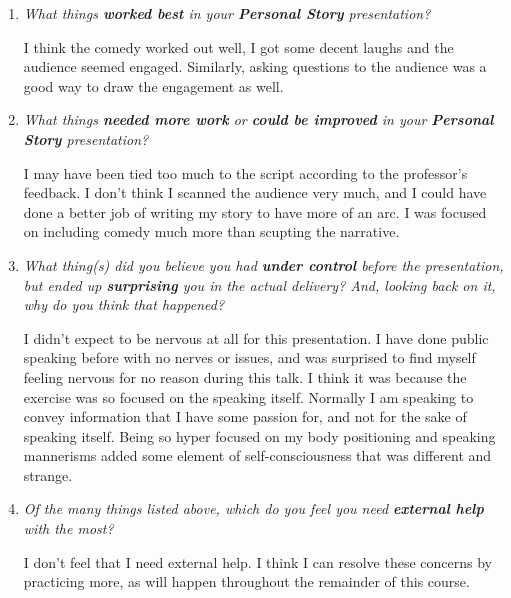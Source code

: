 \documentclass{article}
\newcommand{\ans}[1]{\color{blue} #1 \color{black}}
\begin{document}
\begin{enumerate}
        \item \emph{What things \textbf{worked best} in your \textbf{Personal
              Story} presentation?}
            
            \ans{
                I think the comedy worked out well, I got some decent laughs and
                the audience seemed engaged. Similarly, asking questions to the
                audience was a good way to draw the engagement as well.
            } \hfill \\

        \item \emph{What things \textbf{needed more work} or
              \textbf{could be improved} in your \textbf{Personal Story}
              presentation?}

            \ans{
                I may have been tied too much to the script according to the
                professor's feedback. I don't think I scanned the audience very 
                much, and I could have done a better job of writing my story to
                have more of an arc. I was focused on including comedy much more
                than scupting the narrative.
            } \hfill \\

        \item \emph{What thing(s) did you believe you had \textbf{under control}
              before the presentation, but ended up \textbf{surprising} you in
              the actual delivery? And, looking back on it, why do you think
              that happened?}

            \ans{
                I didn't expect to be nervous at all for this presentation. I
                have done public speaking before with no nerves or issues, and
                was surprised to find myself feeling nervous for no reason
                during this talk. I think it was because the exercise was so
                focused on the speaking itself. Normally I am speaking to convey
                information that I have some passion for, and not for the sake
                of speaking itself. Being so hyper focused on my body
                positioning and speaking mannerisms added some element of
                self-consciousness that was different and strange.
            } \hfill \\

        \item \emph{Of the many things listed above, which do you feel you need
              \textbf{external help} with the most?}

            \ans{
                I don't feel that I need external help. I think I can resolve
                these concerns by practicing more, as will happen throughout the
                remainder of this course.
            }

    \end{enumerate}
\end{document}
